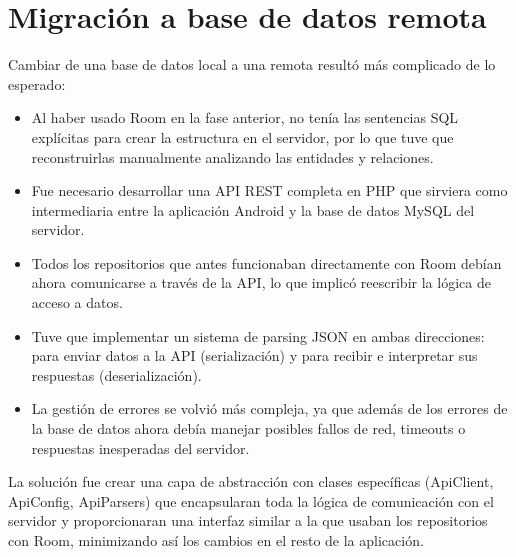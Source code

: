 \documentclass[a4paper,11pt]{report}
\begin{document}
    \section{Migración a base de datos remota}
      Cambiar de una base de datos local a una remota resultó más complicado de lo esperado:
      \begin{itemize}
        \item Al haber usado Room en la fase anterior, no tenía las sentencias SQL explícitas para crear la estructura en el servidor, por lo que tuve que reconstruirlas manualmente analizando las entidades y relaciones.
        \item Fue necesario desarrollar una API REST completa en PHP que sirviera como intermediaria entre la aplicación Android y la base de datos MySQL del servidor.
        \item Todos los repositorios que antes funcionaban directamente con Room debían ahora comunicarse a través de la API, lo que implicó reescribir la lógica de acceso a datos.
        \item Tuve que implementar un sistema de parsing JSON en ambas direcciones: para enviar datos a la API (serialización) y para recibir e interpretar sus respuestas (deserialización).
        \item La gestión de errores se volvió más compleja, ya que además de los errores de la base de datos ahora debía manejar posibles fallos de red, timeouts o respuestas inesperadas del servidor.
      \end{itemize}
      La solución fue crear una capa de abstracción con clases específicas (ApiClient, ApiConfig, ApiParsers) que encapsularan toda la lógica de comunicación con el servidor y proporcionaran una interfaz similar a la que usaban los repositorios con Room, minimizando así los cambios en el resto de la aplicación.
\end{document}
